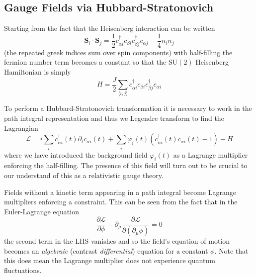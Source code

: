 \documentclass{report}
\begin{document}
\subsection{Gauge Fields via Hubbard-Stratonovich}
Starting from the fact that the Heisenberg interaction can be written 
\begin{equation*}
	\mathbf{S}_i \cdot \mathbf{S}_j 
		= \frac{1}{2}c^{\dagger}_{\alpha i} c_{\beta i}
			c_{\beta j}^\dagger c_{\alpha j}
				- \frac{1}{4}n_i n_j
\end{equation*}
(the repeated greek indices sum over spin components) with half-filling 
the fermion number term becomes a constant so that the $ \text{SU}(2) $
Heisenberg Hamiltonian is simply 
\begin{equation*}
	H = \frac{J}{2}\sum_{\langle i,j \rangle}
		c_{\alpha i}^\dagger c_{\beta i} c_{\beta j}^\dagger c_{\alpha i}
\end{equation*}

To perform a Hubbard-Stratonovich transformation it is necessary to work in the
path integral representation and thus we Legendre transform to find the 
Lagrangian
\begin{equation*}
	\mathcal{L}
		= i\sum_i c_{\alpha i}^\dagger(t) \partial_t c_{\alpha i}(t)
			+ \sum_i \varphi_i(t) (c_{\alpha i}^\dagger (t) c_{\alpha i}(t) - 1)
				- H
\end{equation*}
where we have introduced the background field $ \varphi_i(t) $ as a Lagrange 
multiplier enforcing the half-filling. The presence of this field will turn 
out to be crucial to our understand of this as a relativistic gauge theory. 

\begin{alertbox}[Aside]
Fields without a kinetic term appearing in a path integral become Lagrange 
multipliers enforcing a constraint. This can be seen from the fact that 
in the Euler-Lagrange equation
\begin{equation*}
	\frac{\partial\mathcal{L}}{\partial \phi} - \partial_\mu \frac{\partial
	\mathcal{L}}{\partial(\partial_\mu \phi)} = 0
\end{equation*}
the second term in the LHS vanishes and so the field's equation of motion 
becomes an \textit{algebraic} (contrast \textit{differential}) equation
for a constant $ \phi $. Note that this does mean the Lagrange multiplier 
does not experience quantum fluctuations. 
\end{alertbox}
				
\end{document}
